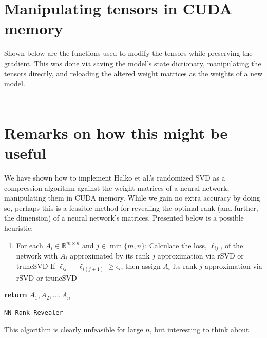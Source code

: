 \documentclass{article}
\begin{document}
\section{Manipulating tensors in CUDA memory}
Shown below are the functions used to modify the tensors while preserving the gradient.
This was done via saving the model's state dictionary, manipulating the tensors directly, and reloading the altered weight matrices as the weights of a new model.
\inputminted{python}{snippets/rSVD.py}
\inputminted{python}{snippets/truncSVD.py}

\section{Remarks on how this might be useful}
We have shown how to implement Halko et al.'s randomized SVD as a compression algorithm against the weight matrices of a neural network, manipulating them in CUDA memory.
While we gain no extra accuracy by doing so, perhaps this is a feasible method for revealing the optimal rank (and further, the dimension) of a neural network's matrices.
Presented below is a possible heuristic:
\begin{center}
	\begin{minipage}{0.5\linewidth} %
		\begin{algorithm}[H]
			\medskip
			\begin{enumerate}
				\item For each $A_i \in \mathbb{R}^{m \times n}$ and $j \in \min\{m,n\}$:
				\subitem Calculate the loss, $\ell_{ij}$, of the network with $A_i$ approximated by its rank $j$ approximation via rSVD or truncSVD
				\subitem If $\ell_{ij} - \ell_{i(j+1)} \geq \epsilon_i$, then assign $A_i$ its rank $j$ approximation via rSVD or truncSVD
			\end{enumerate}
			
			{\bf return} $A_1, A_2, ..., A_n$
			\caption{\texttt{NN Rank Revealer}} %
		\end{algorithm}
	\end{minipage}
\end{center}

This algorithm is clearly unfeasible for large $n$, but interesting to think about.
\end{document}
